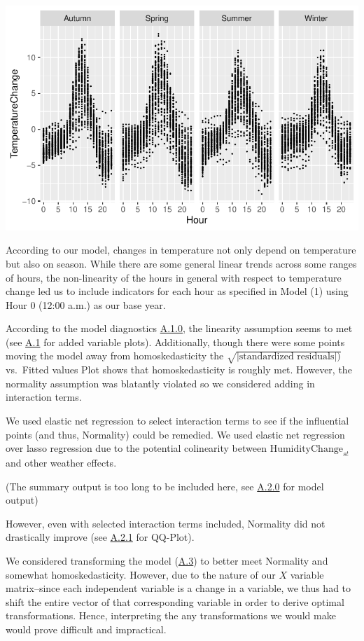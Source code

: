 \documentclass[
  letterpaper,
  DIV=11,
  numbers=noendperiod]{scrartcl}
\begin{document}
\includegraphics{seoul_files/figure-pdf/unnamed-chunk-3-1.pdf}

According to our model, changes in temperature not only depend on
temperature but also on season. While there are some general linear
trends across some ranges of hours, the non-linearity of the hours in
general with respect to temperature change led us to include indicators
for each hour as specified in Model (1) using Hour 0 (12:00 a.m.) as our
base year.

According to the model diagnostics \protect\hyperlink{a10}{A.1.0}, the
linearity assumption seems to met (see \protect\hyperlink{a11}{A.1} for
added variable plots). Additionally, though there were some points
moving the model away from homoskedasticity the
\(\sqrt{|\text{standardized residuals}|)}\) vs.~Fitted values Plot shows
that homoskedasticity is roughly met. However, the normality assumption
was blatantly violated so we considered adding in interaction terms.

We used elastic net regression to select interaction terms to see if the
influential points (and thus, Normality) could be remedied. We used
elastic net regression over lasso regression due to the potential
colinearity between \(\text{HumidityChange}_{st}\) and other weather
effects.

(The summary output is too long to be included here, see
\protect\hyperlink{a20}{A.2.0} for model output)

However, even with selected interaction terms included, Normality did
not drastically improve (see \protect\hyperlink{a21}{A.2.1} for
QQ-Plot).

We considered transforming the model (\protect\hyperlink{a3}{A.3}) to
better meet Normality and somewhat homoskedasticity. However, due to the
nature of our \(X\) variable matrix--since each independent variable is
a change in a variable, we thus had to shift the entire vector of that
corresponding variable in order to derive optimal transformations.
Hence, interpreting the any transformations we would make would prove
difficult and impractical.
\end{document}
